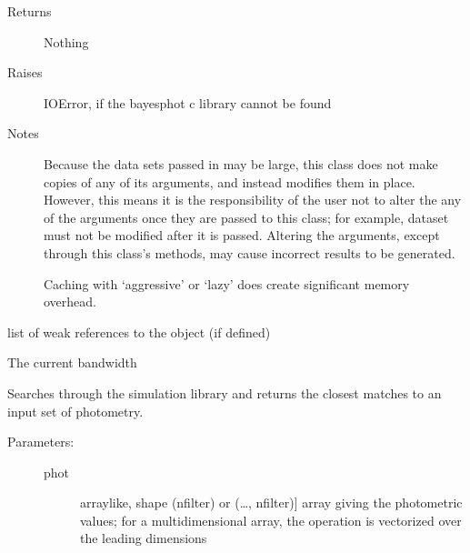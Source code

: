 \documentclass[letterpaper,10pt,english]{sphinxmanual}
\begin{document}
\begin{fulllineitems}
\begin{fulllineitems}
\begin{description}
\item[{Returns}] \leavevmode
Nothing

\item[{Raises}] \leavevmode
IOError, if the bayesphot c library cannot be found

\item[{Notes}] \leavevmode
Because the data sets passed in may be large, this class
does not make copies of any of its arguments, and instead
modifies them in place. However, this means it is the
responsibility of the user not to alter the any of the
arguments once they are passed to this class; for example,
dataset must not be modified after it is passed. Altering the
arguments, except through this class’s methods, may cause
incorrect results to be generated.

Caching with ‘aggressive’ or ‘lazy’ does create significant
memory overhead.

\end{description}

\end{fulllineitems}


\begin{fulllineitems}
\label{\detokenize{bayesphot:slugpy.bayesphot.bp.bp.__weakref__}}
list of weak references to the object (if defined)

\end{fulllineitems}


\begin{fulllineitems}
\label{\detokenize{bayesphot:slugpy.bayesphot.bp.bp.bandwidth}}
The current bandwidth

\end{fulllineitems}


\begin{fulllineitems}
\label{\detokenize{bayesphot:slugpy.bayesphot.bp.bp.bestmatch}}
Searches through the simulation library and returns the closest
matches to an input set of photometry.
\begin{description}
\item[{Parameters:}] \leavevmode\begin{description}
\item[{phot}] \leavevmode{[}arraylike, shape (nfilter) or (…, nfilter){]}
array giving the photometric values; for a
multidimensional array, the operation is vectorized over
the leading dimensions


\end{description}
\end{description}
\end{fulllineitems}
\end{fulllineitems}
\end{document}
